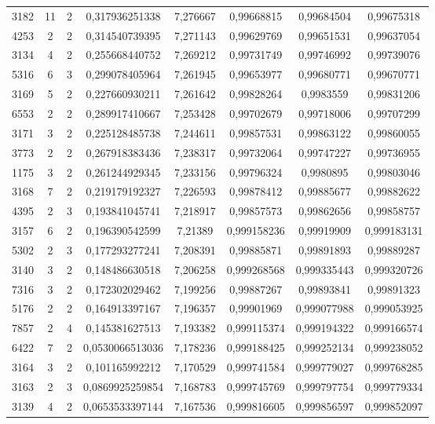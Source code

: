 \begin{longtable}{|c|c|c|c|c|c|c|c|}
3182 & 11 & 2 & 0,317936251338 & 7,276667 & 0,99668815 & 0,99684504 & 0,99675318 \\
4253 & 2 & 2 & 0,314540739395 & 7,271143 & 0,99629769 & 0,99651531 & 0,99637054 \\
3134 & 4 & 2 & 0,255668440752 & 7,269212 & 0,99731749 & 0,99746992 & 0,99739076 \\
5316 & 6 & 3 & 0,299078405964 & 7,261945 & 0,99653977 & 0,99680771 & 0,99670771 \\
3169 & 5 & 2 & 0,227660930211 & 7,261642 & 0,99828264 & 0,9983559 & 0,99831206 \\
6553 & 2 & 2 & 0,289917410667 & 7,253428 & 0,99702679 & 0,99718006 & 0,99707299 \\
3171 & 3 & 2 & 0,225128485738 & 7,244611 & 0,99857531 & 0,99863122 & 0,99860055 \\
3773 & 2 & 2 & 0,267918383436 & 7,238317 & 0,99732064 & 0,99747227 & 0,99736955 \\
1175 & 3 & 2 & 0,261244929345 & 7,233156 & 0,99796324 & 0,9980895 & 0,99803046 \\
3168 & 7 & 2 & 0,219179192327 & 7,226593 & 0,99878412 & 0,99885677 & 0,99882622 \\
4395 & 2 & 3 & 0,193841045741 & 7,218917 & 0,99857573 & 0,99862656 & 0,99858757 \\
3157 & 6 & 2 & 0,196390542599 & 7,21389 & 0,999158236 & 0,99919909 & 0,999183131 \\
5302 & 2 & 3 & 0,177293277241 & 7,208391 & 0,99885871 & 0,99891893 & 0,99889287 \\
3140 & 3 & 2 & 0,148486630518 & 7,206258 & 0,999268568 & 0,999335443 & 0,999320726 \\
7316 & 3 & 2 & 0,172302029462 & 7,199256 & 0,99887267 & 0,99893841 & 0,99891323 \\
5176 & 2 & 2 & 0,164913397167 & 7,196357 & 0,99901969 & 0,999077988 & 0,999053925 \\
7857 & 2 & 4 & 0,145381627513 & 7,193382 & 0,999115374 & 0,999194322 & 0,999166574 \\
6422 & 7 & 2 & 0,0530066513036 & 7,178236 & 0,999188425 & 0,999252134 & 0,999238052 \\
3164 & 3 & 2 & 0,101165992212 & 7,170529 & 0,999741584 & 0,999779027 & 0,999768285 \\
3163 & 2 & 3 & 0,0869925259854 & 7,168783 & 0,999745769 & 0,999797754 & 0,999779334 \\
3139 & 4 & 2 & 0,0653533397144 & 7,167536 & 0,999816605 & 0,999856597 & 0,999852097 \\

\end{longtable}
